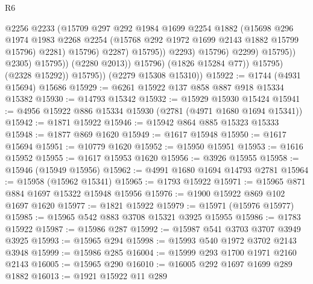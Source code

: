 \begin{lexlean}{R6}
\begin{coremodule}
                                          @2256
                                          @2233
                                          (@15709
                                            @297
                                            @292
                                            @1984
                                            @1699
                                            @2254
                                            @1882
                                            (@15698
                                              @296
                                              @1974
                                              @1983
                                              @2268
                                              @2254
                                              (@15768 @292 @1972 @1699 @2143 @1882 @15799 @15796)
                                              @2281)
                                            @15796)
                                          @2287)
                                        @15795))
                                    @2293)
                                  @15796)
                                @2299)
                              @15795))
                          @2305)
                        @15795))
                    (@2280 @2013))
                  @15796)
                (@1826 @15284 @77))
              @15795)
            (@2328 @15292))
          @15795))
      (@2279 @15308 @15310))
@15922 := @1744 (@4931 @15694) @15686
@15929 := @6261 @15922 @137 @858 @887 @918 @15334 @15382
@15930 := @14793 @15342
@15932 := @15929 @15930 @15424
@15941 := @4956 @15922 @886 @15334 @15930 (@2781 (@4971 @1680 @1694 @15341))
@15942 := @1871 @15922
@15946 := @15942 @864 @885 @15323 @15333
@15948 := @1877 @869 @1620
@15949 := @1617 @15948
@15950 := @1617 @15694
@15951 := @10779 @1620
@15952 := @15950 @15951
@15953 := @1616 @15952
@15955 := @1617 @15953 @1620
@15956 := @3926 @15955
@15958 := @15946 (@15949 @15956)
@15962 := @4991 @1680 @1694 @14793 @2781
@15964 := @15958 (@15962 @15341)
@15965 := @1793 @15922
@15971 := @15965 @871 @884 @1697 @15322 @15948 @15956
@15976 := @1900 @15922 @869 @102 @1697 @1620
@15977 := @1821 @15922
@15979 := @15971 (@15976 @15977)
@15985 := @15965 @542 @883 @3708 @15321 @3925 @15955
@15986 := @1783 @15922
@15987 := @15986 @287
@15992 := @15987 @541 @3703 @3707 @3949 @3925
@15993 := @15965 @294
@15998 := @15993 @540 @1972 @3702 @2143 @3948
@15999 := @15986 @285
@16004 := @15999 @293 @1700 @1971 @2160 @2143
@16005 := @15965 @290
@16010 := @16005 @292 @1697 @1699 @289 @1882
@16013 := @1921 @15922 @11 @289

\end{coremodule}
\end{lexlean}
